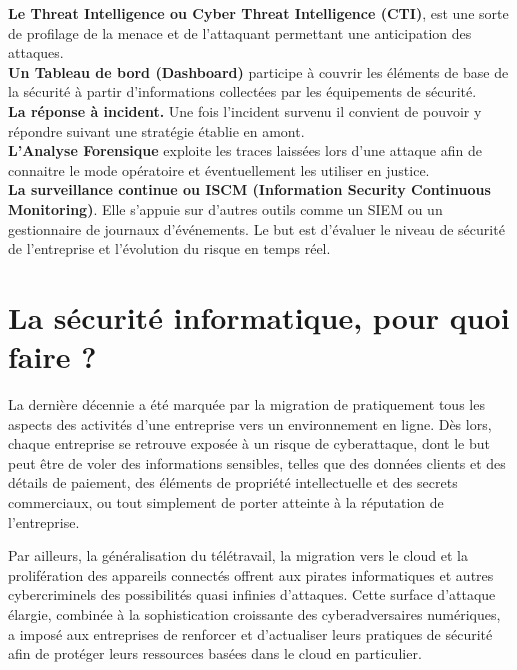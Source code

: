 \textbf{Le Threat Intelligence ou Cyber Threat Intelligence (CTI)}, est une sorte de profilage de la menace et de l’attaquant permettant une anticipation des attaques.\\
 
 \textbf{Un Tableau de bord (Dashboard)} participe à couvrir les éléments de base de la sécurité à partir d’informations collectées par les équipements de sécurité.\\
 
\textbf{La réponse à incident.} Une fois l’incident survenu il convient de pouvoir y répondre suivant une stratégie établie en amont.\\
 
 \textbf{L’Analyse Forensique} exploite les traces laissées lors d’une attaque afin de connaitre le mode opératoire et éventuellement les utiliser en justice.\\
 
\textbf{La surveillance continue ou ISCM (Information Security Continuous Monitoring)}.
 Elle s’appuie sur d’autres outils comme un SIEM ou un gestionnaire de journaux d’événements. Le but est d’évaluer le niveau de sécurité de l’entreprise et l’évolution du risque en temps réel.
 
 
 
 
 \section{La sécurité informatique, pour quoi faire ?}
 La dernière décennie a été marquée par la migration de pratiquement tous les aspects des activités d’une entreprise vers un environnement en ligne. Dès lors, chaque entreprise se retrouve exposée à un risque de cyberattaque, dont le but peut être de voler des informations sensibles, telles que des données clients et des détails de paiement, des éléments de propriété intellectuelle et des secrets commerciaux, ou tout simplement de porter atteinte à la réputation de l’entreprise.\pagebreak

 Par ailleurs, la généralisation du télétravail, la migration vers le cloud et la prolifération des appareils connectés offrent aux pirates informatiques et autres cybercriminels des possibilités quasi infinies d’attaques. Cette surface d’attaque élargie, combinée à la sophistication croissante des cyberadversaires numériques, a imposé aux entreprises de renforcer et d’actualiser leurs pratiques de sécurité afin de protéger leurs ressources basées dans le cloud en particulier.\\
 
